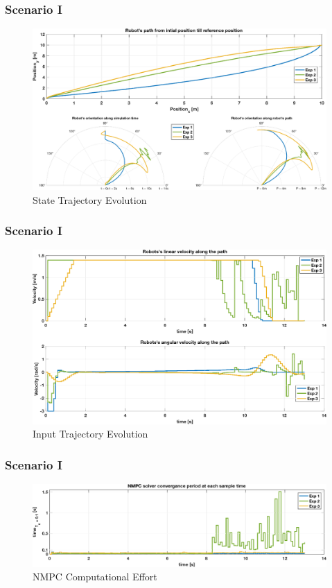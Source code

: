 	\begin{frame}
		\frametitle{Scenario I}
		\begin{figure}[hbtp]
			\centering
			\includegraphics[scale=0.45]{pictures/graphs/sn1_states.eps}
			\caption{State Trajectory Evolution}
		\end{figure}
	\end{frame}

	\begin{frame}
		\frametitle{Scenario I}
		\begin{figure}[hbtp]
			\centering
			\includegraphics[scale=0.42]{pictures/graphs/sn1_inputs.eps}
			\caption{Input Trajectory Evolution}
		\end{figure}
	\end{frame}

	\begin{frame}
		\frametitle{Scenario I}
		\begin{figure}[hbtp]
			\centering
			\includegraphics[scale=0.42]{pictures/graphs/sn1_solver_time.eps}
			\caption{NMPC Computational Effort}
		\end{figure}
	\end{frame}
 
